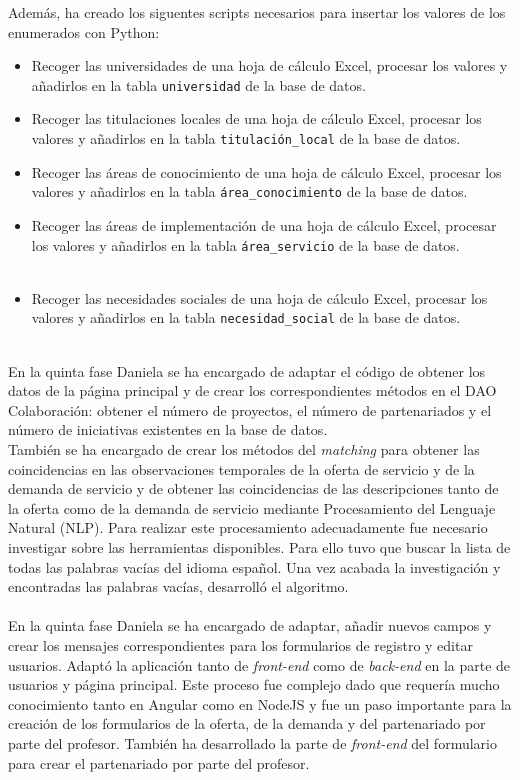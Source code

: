 \documentclass[11pt]{book}
\begin{document}
  Además, ha creado los siguentes scripts necesarios para insertar los valores de los enumerados con Python:
\begin{itemize} 
	\item Recoger las universidades de una hoja de cálculo Excel, procesar los valores y añadirlos en la tabla \texttt{universidad} de la base de datos.
	\item Recoger las titulaciones locales de una hoja de cálculo Excel, procesar los valores y añadirlos en la tabla \texttt{titulación\_local} de la base de datos.
	\item Recoger las áreas de conocimiento de una hoja de cálculo Excel, procesar los valores y añadirlos en la tabla \texttt{área\_conocimiento} de la base de datos.
	\item Recoger las áreas de implementación de una hoja de cálculo Excel, procesar los valores y añadirlos en la tabla \texttt{área\_servicio} de la base de datos.\\\\
	\item Recoger las necesidades sociales de una hoja de cálculo Excel, procesar los valores y añadirlos en la tabla \texttt{necesidad\_social} de la base de datos.\\\\
\end{itemize}
En la quinta fase Daniela se ha encargado de adaptar el código de obtener los datos de la página principal y de crear los correspondientes métodos en el DAO Colaboración: obtener el número de proyectos, el número de partenariados y el número de iniciativas existentes en la base de datos.\\ 
También se ha encargado de crear los métodos del \emph{matching} para obtener las coincidencias en las observaciones temporales de la oferta de servicio y de la demanda de servicio y de obtener las coincidencias de las descripciones tanto de la oferta como de la demanda de servicio mediante Procesamiento del Lenguaje Natural (NLP). Para realizar este procesamiento adecuadamente fue necesario investigar sobre las herramientas disponibles. Para ello tuvo que buscar la lista de todas las palabras vacías del idioma español. Una vez acabada la investigación y encontradas las palabras vacías, desarrolló el algoritmo.\\\\
En la quinta fase Daniela se ha encargado de adaptar, añadir nuevos campos y crear los mensajes correspondientes para los formularios de registro y editar usuarios. Adaptó la aplicación tanto de \textit{front-end} como de \textit{back-end} en la parte de usuarios y página principal. Este proceso fue complejo dado que requería mucho conocimiento tanto en Angular como en NodeJS y fue un paso importante para la creación de los formularios de la oferta, de la demanda y del partenariado por parte del profesor. También ha desarrollado la parte de \textit{front-end} del formulario para crear el partenariado por parte del profesor.
\end{document}

